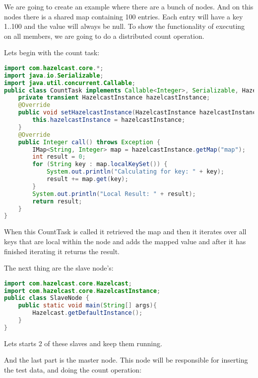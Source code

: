 We are going to create an example where there are a bunch of nodes. And on this nodes there is a shared map containing 100 entries. Each entry will have a key 1..100 and the value will always be null. To show the functionality of executing on all members, we are going to do a distributed count operation.

Lets begin with the count task:
\begin{lstlisting}[language=java]
import com.hazelcast.core.*;
import java.io.Serializable;
import java.util.concurrent.Callable;
public class CountTask implements Callable<Integer>, Serializable, HazelcastInstanceAware {
    private transient HazelcastInstance hazelcastInstance;
    @Override
    public void setHazelcastInstance(HazelcastInstance hazelcastInstance) {
        this.hazelcastInstance = hazelcastInstance;
    }
    @Override
    public Integer call() throws Exception {
        IMap<String, Integer> map = hazelcastInstance.getMap("map");
        int result = 0;
        for (String key : map.localKeySet()) {
            System.out.println("Calculating for key: " + key);
            result += map.get(key);
        }
        System.out.println("Local Result: " + result);
        return result;
    }
}

\end{lstlisting}
When this CountTask is called it retrieved the map and then it iterates over all keys that are local within the node and adds the mapped value and after it has finished iterating it returns the result.

The next thing are the slave node's:
\begin{lstlisting}[language=java]
import com.hazelcast.core.Hazelcast;
import com.hazelcast.core.HazelcastInstance;
public class SlaveNode {
    public static void main(String[] args){
        Hazelcast.getDefaultInstance();
    }
}
\end{lstlisting}
Lets starts 2 of these slaves and keep them running.

And the last part is the master node. This node will be responsible for inserting the test data, and doing the count operation:

